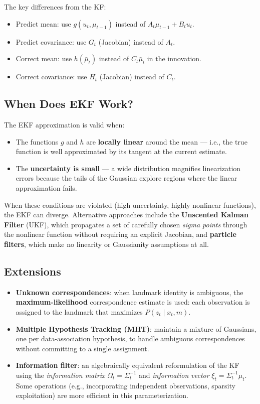 \documentclass[11pt,a4paper]{article}
\theoremstyle{definition}
\theoremstyle{plain}
\theoremstyle{remark}
\begin{document}
The key differences from the KF:
\begin{itemize}
    \item Predict mean: use $g(u_t, \mu_{t-1})$ instead of $A_t\mu_{t-1} + B_t u_t$.
    \item Predict covariance: use $G_t$ (Jacobian) instead of $A_t$.
    \item Correct mean: use $h(\bar{\mu}_t)$ instead of $C_t\bar{\mu}_t$ in the innovation.
    \item Correct covariance: use $H_t$ (Jacobian) instead of $C_t$.
\end{itemize}

\subsection{When Does EKF Work?}

The EKF approximation is valid when:
\begin{itemize}
    \item The functions $g$ and $h$ are \textbf{locally linear} around the mean — i.e., the true function is well approximated by its tangent at the current estimate.
    \item The \textbf{uncertainty is small} — a wide distribution magnifies linearization errors because the tails of the Gaussian explore regions where the linear approximation fails.
\end{itemize}

When these conditions are violated (high uncertainty, highly nonlinear functions), the EKF can diverge. Alternative approaches include the \textbf{Unscented Kalman Filter} (UKF), which propagates a set of carefully chosen \textit{sigma points} through the nonlinear function without requiring an explicit Jacobian, and \textbf{particle filters}, which make no linearity or Gaussianity assumptions at all.

\subsection{Extensions}

\begin{itemize}
    \item \textbf{Unknown correspondences}: when landmark identity is ambiguous, the \textbf{maximum-likelihood} correspondence estimate is used: each observation is assigned to the landmark that maximizes $P(z_t \mid x_t, m)$.
    \item \textbf{Multiple Hypothesis Tracking (MHT)}: maintain a mixture of Gaussians, one per data-association hypothesis, to handle ambiguous correspondences without committing to a single assignment.
    \item \textbf{Information filter}: an algebraically equivalent reformulation of the KF using the \textit{information matrix} $\Omega_t = \Sigma_t^{-1}$ and \textit{information vector} $\xi_t = \Sigma_t^{-1}\mu_t$. Some operations (e.g., incorporating independent observations, sparsity exploitation) are more efficient in this parameterization.
\end{itemize}
\end{document}
